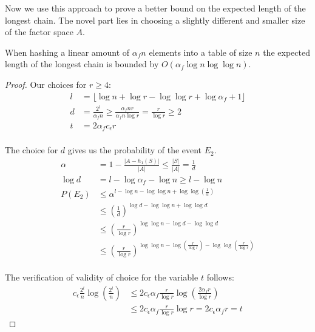 Now we use this approach to prove a better bound on the expected length of the longest chain. The novel part lies in choosing a slightly different and smaller size of the factor space $A$.
\begin{theorem}
\label{elpsl-hashing-linear-amount}
When hashing a linear amount of $\alpha_f n$ elements into a table of size $n$ the expected length of the longest chain is bounded by $O(\alpha_f \log n \log \log n)$.
\end{theorem}
\begin{proof}
Our choices for $r \geq 4$:
\begin{displaymath}
\begin{split}
l & = \lfloor \log n + \log r - \log \log r + \log \alpha_f + 1\rfloor \\
d & = \frac{2^l}{\alpha_f n} \geq \frac{\alpha_f n r}{\alpha_f n \log r} = \frac{r}{\log r} \geq 2 \\
t & = 2 \alpha_f c_\epsilon r \\
\end{split}
\end{displaymath}

The choice for $d$ gives us the probability of the event $E_2$.
\begin{displaymath}
\begin{split}
\alpha & = 1 - \frac{|A - h_1(S)|}{|A|} \leq \frac{|S|}{|A|} = \frac{1}{d} \\
\log d & = l - \log \alpha_f - \log n \geq l - \log n \\
P(E_2) 
	& \leq \alpha^{l - \log n - \log \log n + \log \log \left( \frac{1}{\alpha} \right)} \\
	& \leq \left( \frac{1}{d} \right)^{\log d - \log \log n + \log \log d} \\
	& \leq \left(\frac{r}{\log r}\right)^{\log \log n - \log d - \log \log d} \\
	& \leq \left(\frac{r}{\log r}\right)^{\log \log n - \log \left(\frac{r}{\log r}\right) - \log \log \left(\frac{r}{\log r}\right)} \\
\end{split}
\end{displaymath}

The verification of validity of choice for the variable $t$ follows:
\begin{displaymath}
\begin{split}
c_\epsilon \frac{2^l}{n} \log \left( \frac{2^l}{n} \right) 
	& \leq 2 c_\epsilon \alpha_f \frac{r}{\log r} \log \left( \frac{2 \alpha_f r}{\log r} \right) \\
	& \leq 2 c_\epsilon \alpha_f \frac{r}{\log r} \log r = 2 c_\epsilon \alpha_f r = t
\end{split}
\end{displaymath}


\end{proof}
